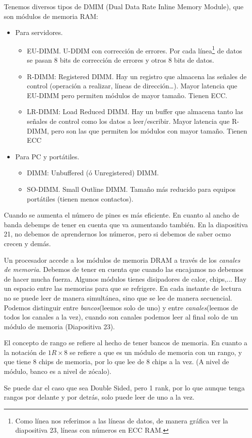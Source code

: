 Tenemos diversos tipos de DMIM (Dual Data Rate Inline Memory Module), que son módulos de memoria RAM:
\begin{itemize}
    \item Para servidores.
    \begin{itemize}
        \item EU-DIMM. U-DDIM con corrección de errores. Por cada línea\footnote{Como línea nos referimos a las líneas de datos, de manera gráfica ver la diapositiva 23, líneas con números en ECC RAM.} de datos se pasan 8 bits de corrección de errores y otros 8 bits de datos.
        \item R-DIMM: Registered DIMM. Hay un registro que almacena
        las señales de control (operación a realizar, líneas de
        dirección…). Mayor latencia que EU-DIMM pero permiten
        módulos de mayor tamaño. Tienen ECC.
        \item LR-DIMM: Load Reduced DIMM. Hay un buffer que
        almacena tanto las señales de control como los datos a
        leer/escribir. Mayor latencia que R-DIMM, pero son las que
        permiten los módulos con mayor tamaño. Tienen ECC
    \end{itemize}
    \item Para PC y portátiles.
    \begin{itemize}
        \item DIMM: Unbuffered (ó Unregistered) DIMM.
        \item SO-DIMM. Small Outline DIMM. Tamaño más reducido para
        equipos portátiles (tienen menos contactos).
    \end{itemize}
\end{itemize}

Cuando se aumenta el número de pines es más eficiente. En cuanto al ancho de banda debemps de tener en cuenta que va aumentando también. En la diapositiva 21, no debemos de aprendernos los números, pero si debemos de saber ocmo crecen y demás.

Un procesador accede a los módulos de memoria DRAM a  través de los \textit{canales de memoria}. Debemos de tener en cuenta que cuando las encajamos no debemos de hacer mucha fuerza. Algunos módulos tienes disipadores de calor, chips,... Hay un espacio entre las memorias para que se refrigere. En cada instante de lectura no se puede leer de manera simultánea, sino que se lee de manera secuencial. Podemos distinguir entre \textit{bancos}(leemos solo de uno) y entre \textit{canales}(leemos de todos los canales a la vez), cuando son canales podemos leer al final solo de un módulo de memoria (Diapositiva 23).

El concepto de rango se refiere al hecho de tener bancos de memoria. En cuanto a la notación de $1R\times8$ se refiere a que es un módulo de memoria con un rango, y que tiene 8 chips de memoria, por lo que lee de 8 chips a la vez. (A nivel de módulo, banco es a nivel de zócalo).

Se puede dar el caso que sea Double Sided, pero 1 rank, por lo que aunque tenga rangos por delante y por detrás, solo puede leer de uno a la vez.







